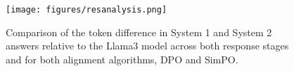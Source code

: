 \begin{figure}[htbp]
  \texttt{[image: figures/resanalysis.png]}
  \caption{Comparison of the token difference in System 1 and System 2 answers relative to the Llama3 model across both response stages and for both alignment algorithms, DPO and SimPO.}
  \label{fig:resanaylsis}
\end{figure}